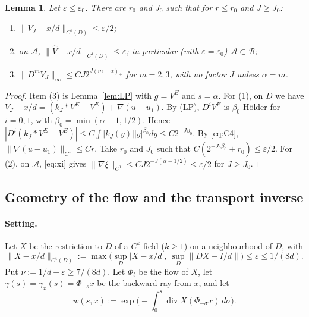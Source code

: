 \documentclass[11pt]{article}
\newtheorem{lemma}[theorem]{Lemma}
\theoremstyle{definition}
\theoremstyle{remark}
\newcommand{\dv}{\operatorname{div}}
\newcommand{\cA}{\mathcal A}
\newcommand{\cB}{\mathcal B}
\begin{document}
\begin{lemma}\label{lem:fields}
Let $\varepsilon\le\varepsilon_0$. There are $r_0$ and $J_0$ such that for $r\le r_0$ and $J\ge J_0$:
\begin{enumerate}[(1)]
\item $\|V_J-x/d\|_{C^1(D)}\le\varepsilon/2$;
\item on $\cA$, $\|\hat V-x/d\|_{C^1(D)}\le\varepsilon$; in particular (with $\varepsilon=\varepsilon_0$) $\cA\subset\cB$;
\item $\|D^mV_J\|_\infty\le CJ2^{J(m-\alpha)_+}$ for $m=2,3$, with no factor $J$ unless $\alpha=m$.
\end{enumerate}
\end{lemma}

\begin{proof}
Item (3) is Lemma~\ref{lem:LP} with $g=V^E$ and $s=\alpha$. For (1), on $D$ we have $V_J-x/d=(k_J*V^E-V^E)+\nabla(u-u_1)$. By (LP), $D^iV^E$ is $\beta_0$-H\"older for $i=0,1$, with $\beta_0=\min(\alpha-1,1/2)$. Hence $|D^i(k_J*V^E-V^E)|\le C\int|k_J(y)||y|^{\beta_0}dy\le C2^{-J\beta_0}$. By \eqref{eq:C4}, $\|\nabla(u-u_1)\|_{C^1}\le Cr$. Take $r_0$ and $J_0$ such that $C(2^{-J_0\beta_0}+r_0)\le\varepsilon/2$. For (2), on $\cA$, \eqref{eq:xi} gives $\|\nabla\xi\|_{C^1}\le CJ2^{-J(\alpha-1/2)}\le\varepsilon/2$ for $J\ge J_0$.
\end{proof}

\subsection{Geometry of the flow and the transport inverse}


\paragraph{Setting.} Let $X$ be the restriction to $D$ of a $C^k$ field ($k\ge1$) on a neighbourhood of $D$, with
\[
\|X-x/d\|_{C^1(D)}:=\max\big(\sup_D|X-x/d|,\ \sup_D\|DX-I/d\|\big)\le\varepsilon\le1/(8d).
\]
Put $\nu:=1/d-\varepsilon\ge7/(8d)$. Let $\Phi_t$ be the flow of $X$, let $\gamma(s)=\gamma_x(s)=\Phi_{-s}x$ be the backward ray from $x$, and let
\[
w(s,x):=\exp\Big(-\int_0^s\dv X(\Phi_{-\sigma}x)\,d\sigma\Big).
\]
\end{document}
